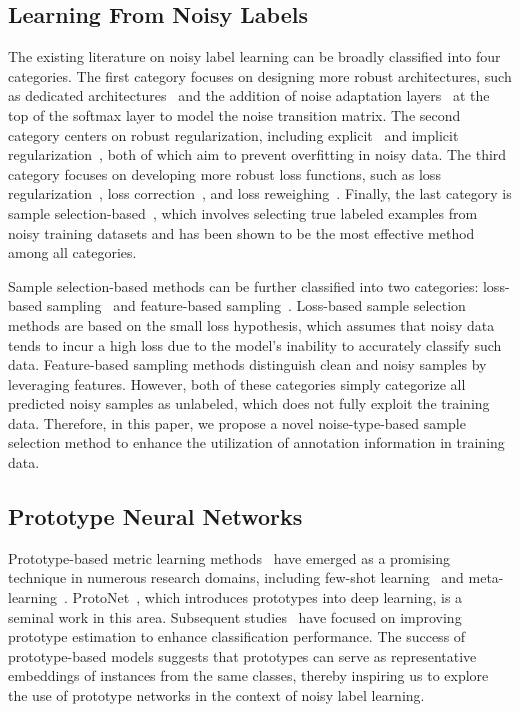 \documentclass[letterpaper]{article} %
\begin{document}
\subsection{Learning From Noisy Labels}\label{sec:related_works_noisy}
The existing literature on noisy label learning can be broadly classified into four categories. The first category focuses on designing more robust architectures, such as dedicated architectures~\cite{ DBLP:conf/cvpr/XiaoXYHW15, DBLP:journals/tip/YaoWTZSZZ19} and the addition of noise adaptation layers~\cite{DBLP:conf/iccv/ChenG15, DBLP:conf/iclr/GoldbergerB17} at the top of the softmax layer to model the noise transition matrix. The second category centers on robust regularization, including explicit~\cite{DBLP:conf/icml/HendrycksLM19, DBLP:conf/cvpr/TannoSSAS19} and implicit regularization~\cite{DBLP:journals/corr/GoodfellowSS14, DBLP:conf/icml/LukasikBMK20}, both of which aim to prevent overfitting in noisy data. The third category focuses on developing more robust loss functions, such as loss regularization~\cite{DBLP:conf/iclr/LyuT20}, loss correction~\cite{DBLP:conf/cvpr/PatriniRMNQ17}, and loss reweighing~\cite{DBLP:journals/pami/LiuT16}. Finally, the last category is sample selection-based~\cite{DBLP:conf/nips/BaiYHYLMNL21, DBLP:conf/iclr/LiSH20}, which involves selecting true labeled examples from noisy training datasets and has been shown to be the most effective method among all categories.

Sample selection-based methods can be further classified into two categories: loss-based sampling~\cite{DBLP:conf/wacv/SachdevaCBRC21, DBLP:conf/wacv/ZheltonozhskiiB22} and feature-based sampling~\cite{DBLP:conf/nips/KimKCCY21, DBLP:conf/nips/WuZ0M020}. Loss-based sample selection methods are based on the small loss hypothesis, which assumes that noisy data tends to incur a high loss due to the model's inability to accurately classify such data. Feature-based sampling methods distinguish clean and noisy samples by leveraging features. However, both of these categories simply categorize all predicted noisy samples as unlabeled, which does not fully exploit the training data. Therefore, in this paper, we propose a novel noise-type-based sample selection method to enhance the utilization of annotation information in training data.

\subsection{Prototype Neural Networks}
Prototype-based metric learning methods~\cite{DBLP:conf/nips/SnellSZ17} have emerged as a promising technique in numerous research domains, including few-shot learning~\cite{DBLP:journals/csur/WangYKN20} and meta-learning~\cite{DBLP:journals/air/VilaltaD02}. ProtoNet~\cite{DBLP:conf/nips/SnellSZ17}, which introduces prototypes into deep learning, is a seminal work in this area. Subsequent studies~\cite{DBLP:conf/cvpr/LiJSSKK21, DBLP:conf/iclr/0001ZXH21} have focused on improving prototype estimation to enhance classification performance. The success of prototype-based models suggests that prototypes can serve as representative embeddings of instances from the same classes, thereby inspiring us to explore the use of prototype networks in the context of noisy label learning.
\end{document}
